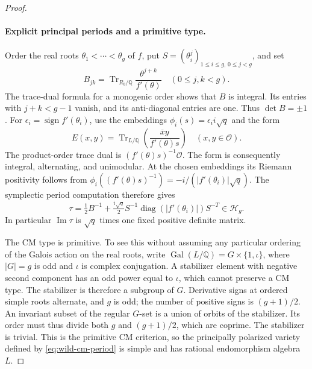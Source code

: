 \documentclass[11pt]{article}
\theoremstyle{definition}
\theoremstyle{remark}
\begin{document}
\begin{proof}
\paragraph{Explicit principal periods and a primitive type.}
Order the real roots \(\theta_1<\cdots<\theta_g\) of \(f\),
put \(S=(\theta_i^j)_{1\leq i\leq g,\,0\leq j<g}\), and set
\[
 B_{jk}=\operatorname{Tr}_{R_b/\mathbb Q}
             \frac{\theta^{j+k}}{f'(\theta)}
 \quad(0\leq j,k<g).
\]
The trace-dual formula for a monogenic order shows that \(B\)
is integral. Its entries with \(j+k<g-1\) vanish, and its
anti-diagonal entries are one. Thus \(\det B=\pm1\).
For \(\epsilon_i=\operatorname{sign}f'(\theta_i)\), use the
embeddings \(\phi_i(s)=\epsilon_i i\sqrt q\) and the form
\[
 E(x,y)=\operatorname{Tr}_{L/\mathbb Q}
       \left(\frac{\overline x y}{f'(\theta)s}\right)
                  \quad(x,y\in\mathcal O).
\]
The product-order trace dual is
\((f'(\theta)s)^{-1}\mathcal O\). The form is consequently
integral, alternating, and unimodular. At the chosen embeddings
its Riemann positivity follows from
\(\phi_i((f'(\theta)s)^{-1})=-i/(|f'(\theta_i)|\sqrt q)\).
The symplectic period computation therefore gives
\begin{equation}
 \tau=\tfrac12B^{-1}
       +\tfrac{i\sqrt q}{2}
          S^{-1}\operatorname{diag}(|f'(\theta_i)|)S^{-T}
                    \in\mathcal H_g.
 \label{eq:wild-cm-period}
\end{equation}
In particular \(\operatorname{Im}\tau\) is \(\sqrt q\) times
one fixed positive definite matrix.

The CM type is primitive. To see this without assuming any
particular ordering of the Galois action on the real roots,
write \(\operatorname{Gal}(L/\mathbb Q)=G\times\{1,\iota\}\),
where \(|G|=g\) is odd and \(\iota\) is complex conjugation.
A stabilizer element with negative second component has an odd
power equal to \(\iota\), which cannot preserve a CM type.
The stabilizer is therefore a subgroup of \(G\).
Derivative signs at ordered simple roots alternate, and \(g\)
is odd; the number of positive signs is \((g+1)/2\).
An invariant subset of the regular \(G\)-set is a union of
orbits of the stabilizer. Its order must thus divide both
\(g\) and \((g+1)/2\), which are coprime. The stabilizer is
trivial. This is the primitive CM criterion, so the principally
polarized variety defined by \eqref{eq:wild-cm-period} is simple and has rational
endomorphism algebra \(L\).


\end{proof}
\end{document}
